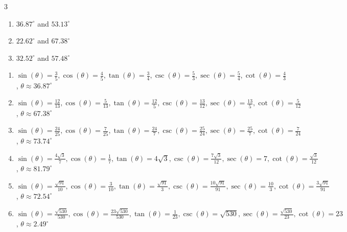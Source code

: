 \documentclass{ximera}
\begin{document}
\begin{multicols}{3}

\begin{enumerate}

\setcounter{enumi}{\value{HW}}

\item $36.87^{\circ}$ and $53.13^{\circ}$
\item $22.62^{\circ}$ and $67.38^{\circ}$
\item $32.52^{\circ}$ and $57.48^{\circ}$

\setcounter{HW}{\value{enumi}}

\end{enumerate}

\end{multicols}


\begin{enumerate}

\setcounter{enumi}{\value{HW}}

\item $\sin(\theta) = \frac{3}{5}, \cos(\theta) = \frac{4}{5}, \tan(\theta) = \frac{3}{4}, \csc(\theta) = \frac{5}{3}, \sec(\theta) = \frac{5}{4}, \cot(\theta) = \frac{4}{3}$, $\theta \approx 36.87^{\circ}$

\item $\sin(\theta) = \frac{12}{13}, \cos(\theta) = \frac{5}{13}, \tan(\theta) = \frac{12}{5}, \csc(\theta) = \frac{13}{12}, \sec(\theta) = \frac{13}{5}, \cot(\theta) = \frac{5}{12}$, $\theta \approx 67.38^{\circ}$

\item $\sin(\theta) = \frac{24}{25}, \cos(\theta) = \frac{7}{25}, \tan(\theta) = \frac{24}{7}, \csc(\theta) = \frac{25}{24}, \sec(\theta) = \frac{25}{7}, \cot(\theta) = \frac{7}{24}$, $\theta \approx 73.74^{\circ}$

\item $\sin(\theta) = \frac{4\sqrt{3}}{7}, \cos(\theta) = \frac{1}{7}, \tan(\theta) = 4\sqrt{3}, \csc(\theta) = \frac{7\sqrt{3}}{12}, \sec(\theta) = 7, \cot(\theta) = \frac{\sqrt{3}}{12}$,  $\theta \approx 81.79^{\circ}$

\item $\sin(\theta) = \frac{\sqrt{91}}{10}, \cos(\theta) = \frac{3}{10}, \tan(\theta) = \frac{\sqrt{91}}{3}, \csc(\theta) = \frac{10\sqrt{91}}{91}, \sec(\theta) = \frac{10}{3}, \cot(\theta) = \frac{3\sqrt{91}}{91}$, $\theta \approx 72.54^{\circ}$

\item $\sin(\theta) = \frac{\sqrt{530}}{530}, \cos(\theta) = \frac{23\sqrt{530}}{530}, \tan(\theta) = \frac{1}{23}, \csc(\theta) = \sqrt{530}, \sec(\theta) = \frac{\sqrt{530}}{23}, \cot(\theta) = 23$, $\theta \approx 2.49^{\circ}$


\end{enumerate}
\end{document}
